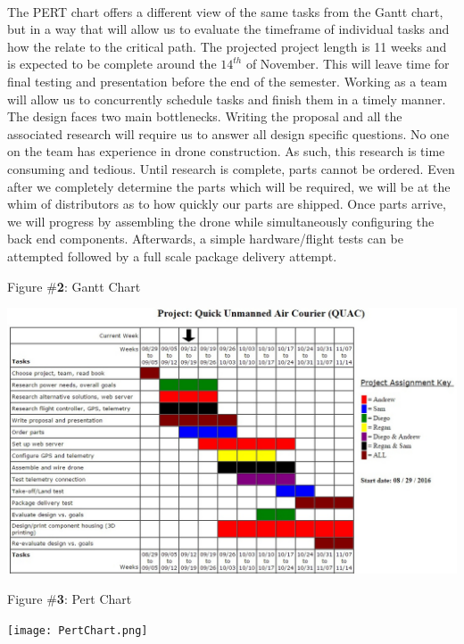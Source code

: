 \documentclass[12pt]{extarticle}
\begin{document}
\ \\
The PERT chart offers a different view of the same tasks from the Gantt chart, but in a way that will allow us to evaluate the timeframe of individual tasks and how the relate to the critical path. The projected project length is 11 weeks and is expected to be complete around the $14^{th}$ of November. This will leave time for final testing and presentation before the end of the semester. Working as a team will allow us to concurrently schedule tasks and finish them in a timely manner. The design faces two main bottlenecks. Writing the proposal and all the associated research will require us to answer all design specific questions.  No one on the team has experience in drone construction.  As such, this research is time consuming and tedious.  Until research is complete, parts cannot be ordered.  Even after we completely determine the parts which will be required, we will be at the whim of distributors as to how quickly our parts are shipped.  Once parts arrive, we will progress by assembling the drone while simultaneously configuring the back end components.  Afterwards, a simple hardware/flight tests can be attempted followed by a full scale package delivery attempt. 

\begin{center}
    Figure \#\textbf{2}: Gantt Chart
\end{center}
\begin{center}
    \includegraphics[scale=0.6]{gantt_chart.jpg}
\end{center}
\newpage
\noindent
\begin{center}
    Figure \#\textbf{3}: Pert Chart
\end{center}
\begin{center}
    \texttt{[image: PertChart.png]}
\end{center}
\end{document}

